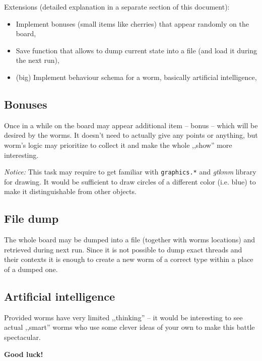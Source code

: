 \documentclass{article}
\begin{document}
Extensions (detailed explanation in a separate section of this document):
\begin{itemize}
  \item Implement bonuses (small items like cherries) that appear randomly
    on the board,
  \item Save function that allows to dump current state into a file (and load
    it during the next run),
  \item (big) Implement behaviour schema for a worm, basically artificial
    intelligence,
\end{itemize}


\subsection{Bonuses}

Once in a while on the board may appear additional item -- bonus -- which
will be desired by the worms. It doesn't need to actually give any points
or anything, but worm's logic may prioritize to collect it and make the whole
,,show'' more interesting.

\textit{Notice:} This task may require to get familiar with \texttt{graphics.*}
and \textit{gtkmm} library for drawing. It would be sufficient to draw circles
of a different color (i.e. blue) to make it distinguishable from other objects.

\subsection{File dump}

The whole board may be dumped into a file (together with worms locations)
and retrieved during next run. Since it is not possible to dump exact threads
and their contexts it is enough to create a new worm of a correct type
within a place of a dumped one.

\subsection{Artificial intelligence}

Provided worms have very limited ,,thinking'' -- it would be interesting to see
actual ,,smart'' worms who use some clever ideas of your own to make this
battle spectacular.


\vspace{1cm}
\textbf{Good luck!}
\end{document}

